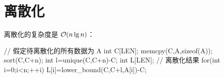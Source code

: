 \section{离散化}
离散化的复杂度是 $\mathcal{O}(n \lg n)$：
\begin{Cpp}
// 假定待离散化的所有数据为 A
int C[LEN];
memcpy(C,A,sizeof(A));
sort(C,C+n);
int l=unique(C,C+n)-C;
int L[LEN]; // 离散化结果
for(int i=0;i<n;++i)
  L[i]=lower_bound(C,C+l,A[i])-C;
\end{Cpp}

